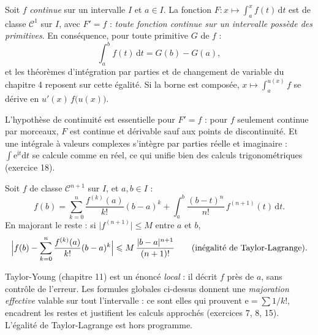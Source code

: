 
\begin{theoreme}
Soit $f$ \emph{continue} sur un intervalle $I$ et $a\in I$. La fonction
$F:x\mapsto\displaystyle\int_{a}^{x}f(t)\,\mathrm{d}t$ est de classe
$\mathcal{C}^{1}$ sur $I$, avec $F'=f$ : \emph{toute fonction continue sur
un intervalle possède des primitives}. En conséquence, pour toute primitive
$G$ de $f$ :
\[
\int_{a}^{b}f(t)\,\mathrm{d}t=G(b)-G(a) ,
\]
et les théorèmes d'intégration par parties et de changement de variable du
chapitre 4 reposent sur cette égalité. Si la borne est composée,
$x\mapsto\int_{a}^{u(x)}f$ se dérive en $u'(x)\,f\bigl(u(x)\bigr)$.
\end{theoreme}

\begin{attention}
L'hypothèse de continuité est essentielle pour $F'=f$ : pour $f$ seulement
continue par morceaux, $F$ est continue et dérivable sauf aux points de
discontinuité. Et une intégrale à valeurs complexes s'intègre par parties
réelle et imaginaire : $\int\mathrm{e}^{\mathrm{i}t}\mathrm{d}t$ se calcule
comme en réel, ce qui unifie bien des calculs trigonométriques
(exercice 18).
\end{attention}


\begin{theoreme}
Soit $f$ de classe $\mathcal{C}^{n+1}$ sur $I$, et $a,b\in I$ :
\[
f(b)=\sum_{k=0}^{n}\frac{f^{(k)}(a)}{k!}(b-a)^{k}
+\int_{a}^{b}\frac{(b-t)^{n}}{n!}\,f^{(n+1)}(t)\,\mathrm{d}t .
\]
En majorant le reste : si $\bigl|f^{(n+1)}\bigr|\leqslant M$ entre $a$ et
$b$,
\[
\Bigl|f(b)-\sum_{k=0}^{n}\frac{f^{(k)}(a)}{k!}(b-a)^{k}\Bigr|
\leqslant M\,\frac{|b-a|^{n+1}}{(n+1)!}
\qquad\text{(inégalité de Taylor-Lagrange).}
\]
\end{theoreme}

\begin{attention}
Taylor-Young (chapitre 11) est un énoncé \emph{local} : il décrit $f$ près
de $a$, sans contrôle de l'erreur. Les formules globales ci-dessus donnent
une \emph{majoration effective} valable sur tout l'intervalle : ce sont
elles qui prouvent $\mathrm{e}=\sum1/k!$, encadrent les restes et
justifient les calculs approchés (exercices 7, 8, 15). L'égalité de
Taylor-Lagrange est hors programme.
\end{attention}

